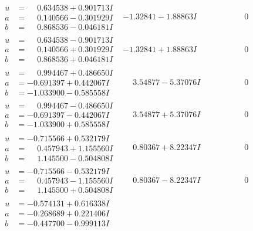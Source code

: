 \documentclass[1p]{elsarticle_modified}
\theoremstyle{definition}
\begin{document}
$$\begin{array}{c|c|c}
\begin{aligned}
u &= \phantom{-}0.634538 + 0.901713 I \\
a &= \phantom{-}0.140566 - 0.301929 I \\
b &= \phantom{-}0.868536 - 0.046181 I\end{aligned}
 & -1.32841 - 1.88863 I & \phantom{-0.000000 } 0 \\ \hline\begin{aligned}
u &= \phantom{-}0.634538 - 0.901713 I \\
a &= \phantom{-}0.140566 + 0.301929 I \\
b &= \phantom{-}0.868536 + 0.046181 I\end{aligned}
 & -1.32841 + 1.88863 I & \phantom{-0.000000 } 0 \\ \hline\begin{aligned}
u &= \phantom{-}0.994467 + 0.486650 I \\
a &= -0.691397 + 0.442067 I \\
b &= -1.033900 - 0.585558 I\end{aligned}
 & \phantom{-}3.54877 - 5.37076 I & \phantom{-0.000000 } 0 \\ \hline\begin{aligned}
u &= \phantom{-}0.994467 - 0.486650 I \\
a &= -0.691397 - 0.442067 I \\
b &= -1.033900 + 0.585558 I\end{aligned}
 & \phantom{-}3.54877 + 5.37076 I & \phantom{-0.000000 } 0 \\ \hline\begin{aligned}
u &= -0.715566 + 0.532179 I \\
a &= \phantom{-}0.457943 + 1.155560 I \\
b &= \phantom{-}1.145500 - 0.504808 I\end{aligned}
 & \phantom{-}0.80367 + 8.22347 I & \phantom{-0.000000 } 0 \\ \hline\begin{aligned}
u &= -0.715566 - 0.532179 I \\
a &= \phantom{-}0.457943 - 1.155560 I \\
b &= \phantom{-}1.145500 + 0.504808 I\end{aligned}
 & \phantom{-}0.80367 - 8.22347 I & \phantom{-0.000000 } 0 \\ \hline\begin{aligned}
u &= -0.574131 + 0.616338 I \\
a &= -0.268689 + 0.221406 I \\
b &= -0.447700 - 0.999113 I\end{aligned}

\end{array}$$
\end{document}
